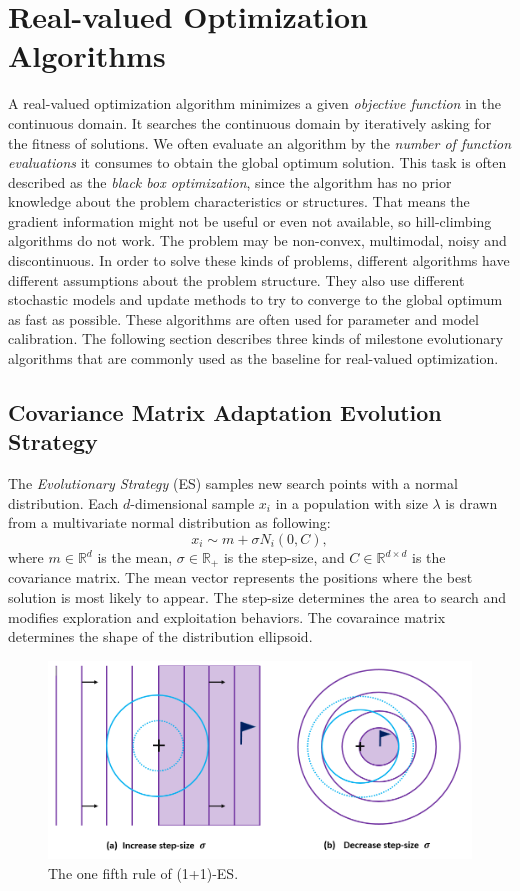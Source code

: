 \chapter{Real-valued Optimization Algorithms}
\label{chapter:algos}

A real-valued optimization algorithm minimizes a given \textit{objective function} in the continuous domain.
It searches the continuous domain by iteratively asking for the fitness of solutions.
We often evaluate an algorithm by the \textit{number of function evaluations} it consumes to obtain the global optimum solution.
This task is often described as the \textit{black box optimization},
since the algorithm has no prior knowledge about the problem characteristics or structures.
That means the gradient information might not be useful or even not available, so hill-climbing algorithms do not work.
The problem may be non-convex, multimodal, noisy and discontinuous.
In order to solve these kinds of problems, different algorithms have different assumptions about the problem structure.
They also use different stochastic models and update methods to try to converge to the global optimum as fast as possible.
These algorithms are often used for parameter and model calibration.  
The following section describes three kinds of milestone evolutionary algorithms 
that are commonly used as the baseline for real-valued optimization.


\section{Covariance Matrix Adaptation Evolution Strategy}
The \textit{Evolutionary Strategy} (ES) samples new search points with a normal distribution.
Each $d$-dimensional sample $x_i$ in a population with size $\lambda$ is drawn from a multivariate normal distribution as following:  
\begin{displaymath}
x_i \sim m + \sigma N_i(0,C),
\end{displaymath}
where $m \in \mathbb{R}^d$ is the mean, $\sigma \in \mathbb{R}_+$ is the step-size, and $C \in \mathbb{R}^{d \times d}$ is the covariance matrix.
The mean vector represents the positions where the best solution is most likely to appear.
The step-size determines the area to search and modifies exploration and exploitation behaviors.
The covaraince matrix determines the shape of the distribution ellipsoid.

\begin{figure}
\centering
\includegraphics[width=\textwidth]{one_plus_one_ES}
\caption{The one fifth rule of (1+1)-ES.}\label{fig:one_plus_one_ES}
\end{figure}

